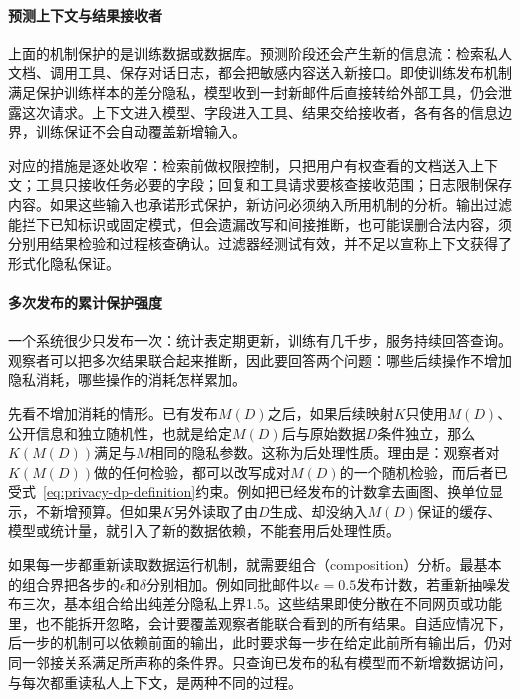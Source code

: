 \paragraph{预测上下文与结果接收者}
\label{sec:privacy-inference-context}

上面的机制保护的是训练数据或数据库。预测阶段还会产生新的信息流：检索私人文档、调用工具、保存对话日志，都会把敏感内容送入新接口。即使训练发布机制满足保护训练样本的差分隐私，模型收到一封新邮件后直接转给外部工具，仍会泄露这次请求。上下文进入模型、字段进入工具、结果交给接收者，各有各的信息边界，训练保证不会自动覆盖新增输入。

对应的措施是逐处收窄：检索前做权限控制，只把用户有权查看的文档送入上下文；工具只接收任务必要的字段；回复和工具请求要核查接收范围；日志限制保存内容。如果这些输入也承诺形式保护，新访问必须纳入所用机制的分析。输出过滤能拦下已知标识或固定模式，但会遗漏改写和间接推断，也可能误删合法内容，须分别用结果检验和过程核查确认。过滤器经测试有效，并不足以宣称上下文获得了形式化隐私保证。

\paragraph{多次发布的累计保护强度}
\label{sec:privacy-repeated-use}

一个系统很少只发布一次：统计表定期更新，训练有几千步，服务持续回答查询。观察者可以把多次结果联合起来推断，因此要回答两个问题：哪些后续操作不增加隐私消耗，哪些操作的消耗怎样累加。

先看不增加消耗的情形。已有发布$M(D)$之后，如果后续映射$K$只使用$M(D)$、公开信息和独立随机性，也就是给定$M(D)$后与原始数据$D$条件独立，那么$K(M(D))$满足与$M$相同的隐私参数。这称为后处理性质。理由是：观察者对$K(M(D))$做的任何检验，都可以改写成对$M(D)$的一个随机检验，而后者已受式~\eqref{eq:privacy-dp-definition}约束。例如把已经发布的计数拿去画图、换单位显示，不新增预算。但如果$K$另外读取了由$D$生成、却没纳入$M(D)$保证的缓存、模型或统计量，就引入了新的数据依赖，不能套用后处理性质。

如果每一步都重新读取数据运行机制，就需要组合（composition）分析。最基本的组合界把各步的$\epsilon$和$\delta$分别相加。例如同批邮件以$\epsilon=0.5$发布计数，若重新抽噪发布三次，基本组合给出纯差分隐私上界1.5。这些结果即使分散在不同网页或功能里，也不能拆开忽略，会计要覆盖观察者能联合看到的所有结果。自适应情况下，后一步的机制可以依赖前面的输出，此时要求每一步在给定此前所有输出后，仍对同一邻接关系满足所声称的条件界。只查询已发布的私有模型而不新增数据访问，与每次都重读私人上下文，是两种不同的过程。

